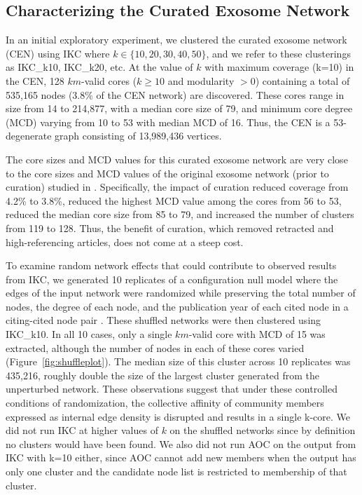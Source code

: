 \documentclass[12pt, oneside]{article}   	%
\begin{document}
\subsection{Characterizing the Curated Exosome Network}
 In an initial exploratory experiment, we clustered the curated exosome network (CEN) using IKC where $k \in {\{10,20,30,40, 50\}}$, and we refer to these clusterings as
 IKC\_{k10},  IKC\_{k20}, etc. 
At the value of $k$ with maximum coverage (k=10) in the CEN, 128 $km$-valid cores ($k \geq 10$ and modularity $> 0$) containing a total of 535,165 nodes (3.8\% of the CEN network) are discovered. These cores range in size from 14 to 214,877, with a median core size of 79, and minimum core degree (MCD) varying from 10 to 53 with median MCD of 16. Thus, the CEN is a 53-degenerate graph consisting of 13,989,436 vertices. 


The core sizes and MCD values for this curated exosome network are very close to the core sizes and MCD values of the original exosome network (prior to curation) studied in \cite{Wedell2022}.
Specifically, the impact of curation reduced coverage
 from 4.2\% to 3.8\%, reduced the highest MCD value among the cores from 56 to 53, reduced the median core size from 85 to 79, and increased the number of clusters  from 119 to 128.
 Thus, the benefit of curation, which removed retracted and high-referencing articles, does not come at a steep cost.

	
To examine random network effects that could contribute to observed results from IKC, we generated 10 replicates of a configuration null model where the edges of the input network were randomized while preserving the total number of nodes, the degree of each node,  and the publication year of each cited node in a citing-cited node pair \citep{bradley2020,uzzi2013}. These shuffled networks were then clustered using IKC\_k10. In all 10 cases, only a single $km$-valid core with MCD of 15 was extracted, although the number of nodes in each of these cores varied (Figure~\ref{fig:shuffleplot}).
 The median size of this cluster across 10 replicates was 435,216, roughly double the size of the largest cluster generated from the unperturbed network. These observations suggest that under these controlled conditions of randomization, the collective affinity of community members expressed as internal edge density is disrupted and results in a single k-core. We did not run IKC at higher values of $k$ on the shuffled networks since  by definition no clusters would have been found. We also did not run AOC on the output from IKC with  k=10 either,  since AOC cannot add new members when the output has only one cluster and the candidate node list is restricted to membership of that cluster.
\end{document}
